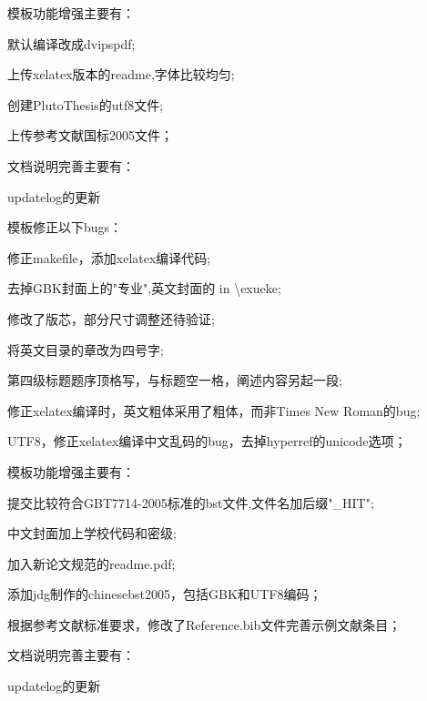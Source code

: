 模板功能增强主要有：
\begin{hitlist}
    \item 默认编译改成dvipspdf;
    \item 上传xelatex版本的readme,字体比较均匀;
    \item 创建PlutoThesis的utf8文件;
    \item 上传参考文献国标2005文件；
\end{hitlist}

文档说明完善主要有：
\begin{hitlist}
   \item  updatelog的更新
\end{hitlist}

模板修正以下bugs：
\begin{hitlist}
    \item 修正makefile，添加xelatex编译代码; 
    \item 去掉GBK封面上的"专业",英文封面的 in \textbackslash exueke; 
    \item 修改了版芯，部分尺寸调整还待验证; 
    \item 将英文目录的章改为四号字; 
    \item 第四级标题题序顶格写，与标题空一格，阐述内容另起一段; 
    \item 修正xelatex编译时，英文粗体采用了粗体，而非Times New Roman的bug;
    \item UTF8，修正xelatex编译中文乱码的bug，去掉hyperref的unicode选项； 
\end{hitlist}


模板功能增强主要有：
\begin{hitlist}
    \item 提交比较符合GBT7714-2005标准的bst文件,文件名加后缀"\_HIT"; 
    \item 中文封面加上学校代码和密级; 
    \item 加入新论文规范的readme.pdf;
    \item 添加jdg制作的chinesebst2005，包括GBK和UTF8编码；
    \item 根据参考文献标准要求，修改了Reference.bib文件完善示例文献条目；
\end{hitlist}

文档说明完善主要有：
\begin{hitlist}
   \item  updatelog的更新
\end{hitlist}

